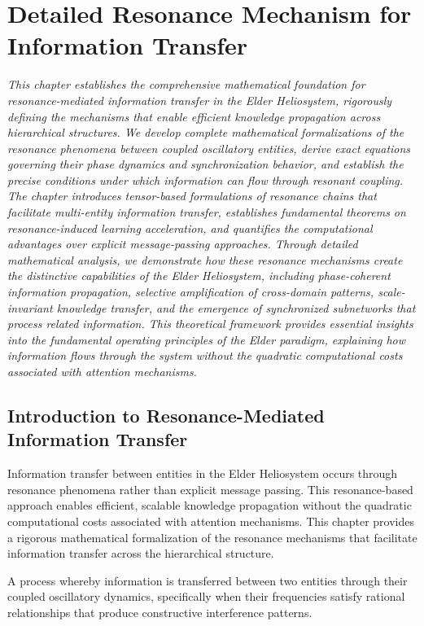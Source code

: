 \chapter{Detailed Resonance Mechanism for Information Transfer}

\textit{This chapter establishes the comprehensive mathematical foundation for resonance-mediated information transfer in the Elder Heliosystem, rigorously defining the mechanisms that enable efficient knowledge propagation across hierarchical structures. We develop complete mathematical formalizations of the resonance phenomena between coupled oscillatory entities, derive exact equations governing their phase dynamics and synchronization behavior, and establish the precise conditions under which information can flow through resonant coupling. The chapter introduces tensor-based formulations of resonance chains that facilitate multi-entity information transfer, establishes fundamental theorems on resonance-induced learning acceleration, and quantifies the computational advantages over explicit message-passing approaches. Through detailed mathematical analysis, we demonstrate how these resonance mechanisms create the distinctive capabilities of the Elder Heliosystem, including phase-coherent information propagation, selective amplification of cross-domain patterns, scale-invariant knowledge transfer, and the emergence of synchronized subnetworks that process related information. This theoretical framework provides essential insights into the fundamental operating principles of the Elder paradigm, explaining how information flows through the system without the quadratic computational costs associated with attention mechanisms.}

\section{Introduction to Resonance-Mediated Information Transfer}

Information transfer between entities in the Elder Heliosystem occurs through resonance phenomena rather than explicit message passing. This resonance-based approach enables efficient, scalable knowledge propagation without the quadratic computational costs associated with attention mechanisms. This chapter provides a rigorous mathematical formalization of the resonance mechanisms that facilitate information transfer across the hierarchical structure.

\begin{definition}
A process whereby information is transferred between two entities through their coupled oscillatory dynamics, specifically when their frequencies satisfy rational relationships that produce constructive interference patterns.
\end{definition}

